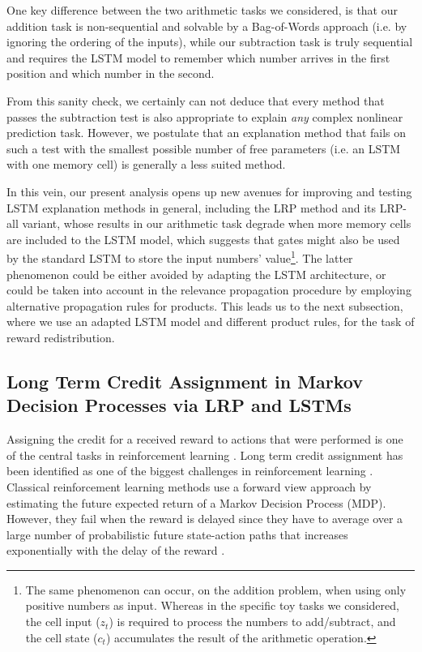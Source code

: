 \documentclass[runningheads]{llncs}
\begin{document}
One key difference between the two arithmetic tasks we considered, is that our addition task is non-sequential and solvable by a Bag-of-Words approach (i.e. by ignoring the ordering of the inputs), while our subtraction task is truly sequential and requires the LSTM model to remember which number arrives in the first position and which number in the second.

From this sanity check, we certainly can not deduce that every method that passes the subtraction test is also appropriate to explain {\it any} complex nonlinear prediction task.
However, we postulate that an explanation method that fails on such a test with the smallest possible number of free parameters (i.e. an LSTM with one memory cell) is generally a less suited method.

In this vein, our present analysis opens up new avenues for improving and testing LSTM explanation methods in general, including the LRP method and its LRP-all variant, whose results in our arithmetic task 
degrade when more memory cells are included to the LSTM model, which suggests that gates might also be used by the standard LSTM to store the input numbers' value\footnote{The same phenomenon can occur, on the addition problem, when using only positive numbers as input. Whereas in the specific toy tasks we considered, the cell input ($z_t$) is required to process the numbers to add/subtract, and the cell state ($c_t$) accumulates the result of the arithmetic operation.}.
The latter phenomenon could be either avoided by adapting the LSTM architecture, or could be taken into account in the relevance propagation procedure by employing alternative propagation rules for products. 
This leads us to the next subsection, where we use an adapted LSTM model and different product rules, for the task of reward redistribution.


\subsection{Long Term Credit Assignment in Markov Decision Processes via LRP and LSTMs}
\label{Arr:sec:Experiments_with_adapted_LSTMs}
Assigning the credit for a received reward to actions that were performed
is one of the central tasks in reinforcement learning \cite{Arr:Sutton:17book}.
Long term credit assignment has been identified as one of the
biggest challenges in reinforcement learning \cite{Arr:Sahni:18}.
Classical reinforcement learning methods use a forward view approach by
estimating the future expected return of a Markov Decision Process (MDP).
However, they fail when the reward is delayed since they have 
to average over a large number of probabilistic future state-action paths
that increases exponentially with the delay of the reward \cite{Arr:Rahmandad:09,Arr:Luoma:17}.
\end{document}
